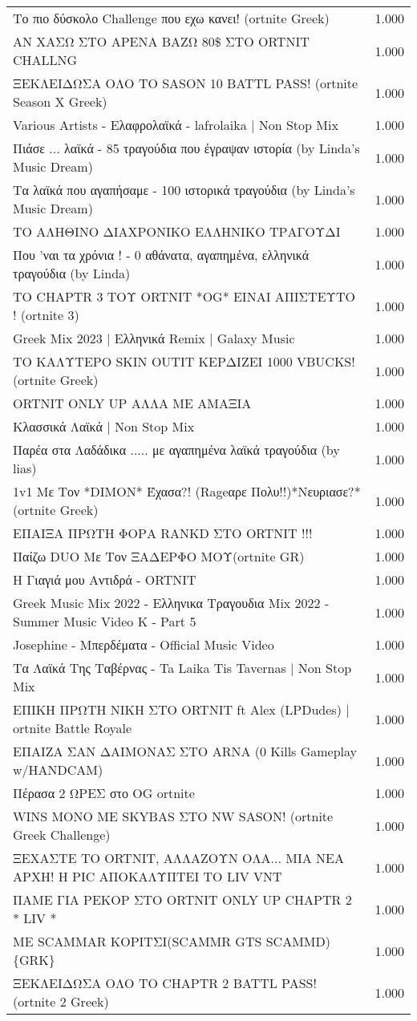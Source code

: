\begin{table}
\begin{tabular}{|p{10cm}|p{1cm}|}
Το πιο δύσκολο Challenge που εχω κανει! (ortnite Greek) & 1.000 \\
ΑΝ ΧΑΣΩ ΣΤΟ ΑΡΕΝΑ ΒΑΖΩ 80\$ ΣΤΟ ORTNIT CHALLNG & 1.000 \\
ΞΕΚΛΕΙΔΩΣΑ ΟΛΟ ΤΟ SASON 10 BATTL PASS! (ortnite Season X Greek) & 1.000 \\
Various Artists - Ελαφρολαϊκά - lafrolaika | Non Stop Mix & 1.000 \\
Πιάσε ... λαϊκά - 85 τραγούδια που έγραψαν ιστορία (by Linda's Music Dream) & 1.000 \\
Τα λαϊκά που αγαπήσαμε - 100 ιστορικά τραγούδια (by Linda's Music Dream) & 1.000 \\
ΤΟ ΑΛΗΘΙΝΟ ΔΙΑΧΡΟΝΙΚΟ ΕΛΛΗΝΙΚΟ ΤΡΑΓΟΥΔΙ & 1.000 \\
Που 'ναι τα χρόνια ! - 0 αθάνατα, αγαπημένα, ελληνικά τραγούδια (by Linda) & 1.000 \\
ΤΟ CHAPTR 3 ΤΟΥ ORTNIT *OG* ΕΙΝΑΙ ΑΠΙΣΤΕΥΤΟ ! (ortnite 3) & 1.000 \\
Greek Mix 2023 | Ελληνικά Remix | Galaxy Music & 1.000 \\
ΤΟ ΚΑΛΥΤΕΡΟ SKIN OUTIT ΚΕΡΔΙΖΕΙ 1000 VBUCKS! (ortnite Greek) & 1.000 \\
ORTNIT ONLY UP ΑΛΛΑ ΜΕ ΑΜΑΞΙΑ & 1.000 \\
Κλασσικά Λαϊκά | Non Stop Mix & 1.000 \\
Παρέα στα Λαδάδικα ..... με αγαπημένα λαϊκά τραγούδια (by lias) & 1.000 \\
1v1 Με Τον *DIMON* Έχασα?! (Rageαρε Πολυ!!)*Νευριασε?*(ortnite Greek) & 1.000 \\
ΕΠΑΙΞΑ ΠΡΩΤΗ ΦΟΡΑ RANKD ΣΤΟ ORTNIT !!! & 1.000 \\
Παίζω DUO Με Τον ΞΑΔΕΡΦΟ ΜΟΥ(ortnite GR) & 1.000 \\
Η Γιαγιά μου Αντιδρά - ORTNIT & 1.000 \\
Greek Music Mix 2022 - Ελληνικα Τραγουδια Mix 2022 - Summer Music Video K - Part 5 & 1.000 \\
Josephine - Μπερδέματα - Official Music Video & 1.000 \\
Τα Λαϊκά Της Ταβέρνας - Ta Laika Tis Tavernas | Non Stop Mix & 1.000 \\
ΕΠΙΚΗ ΠΡΩΤΗ ΝΙΚΗ ΣΤΟ ORTNIT ft Alex (LPDudes) | ortnite Battle Royale & 1.000 \\
ΕΠΑΙΖΑ ΣΑΝ ΔΑΙΜΟΝΑΣ ΣΤΟ ARNA  (0 Kills Gameplay w/HANDCAM) & 1.000 \\
Πέρασα 2 ΩΡΕΣ στο OG ortnite & 1.000 \\
WINS ΜΟΝΟ ΜΕ SKYBAS ΣΤΟ NW SASON! (ortnite Greek Challenge) & 1.000 \\
ΞΕΧΑΣΤΕ ΤΟ ORTNIT, ΑΛΛΑΖΟΥΝ ΟΛΑ... ΜΙΑ ΝΕΑ ΑΡΧΗ!  Η PIC ΑΠΟΚΑΛΥΠΤΕΙ ΤΟ LIV VNT & 1.000 \\
ΠΑΜΕ ΓΙΑ ΡΕΚΟΡ ΣΤΟ ORTNIT ONLY UP CHAPTR 2 * LIV * & 1.000 \\
ΜΕ SCAMMAR ΚΟΡΙΤΣΙ(SCAMMR GTS SCAMMD)\{GRK\} & 1.000 \\
ΞΕΚΛΕΙΔΩΣΑ ΟΛΟ ΤΟ CHAPTR 2 BATTL PASS! (ortnite 2 Greek) & 1.000 \\
\bottomrule
\end{tabular}
\end{table}
